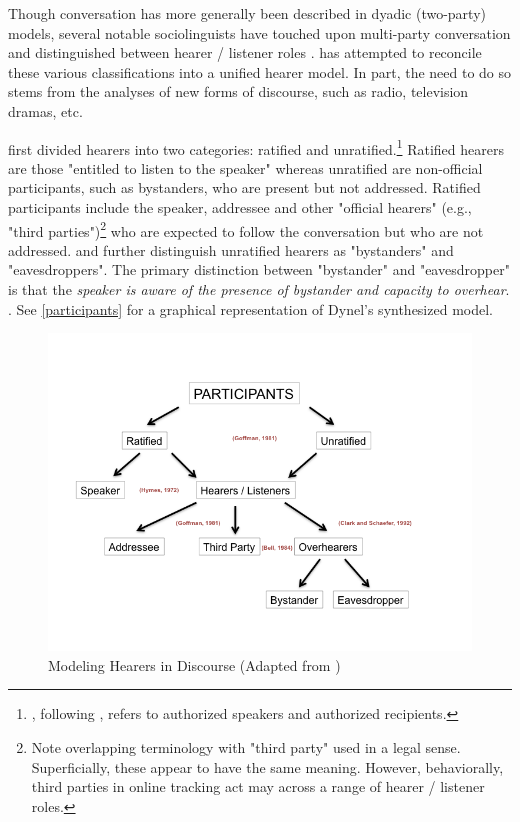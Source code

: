 Though conversation has more generally been described in dyadic (two-party) models, several notable sociolinguists have touched upon multi-party conversation and distinguished between hearer / listener roles \citep{Hymes:1974wr, Goffman:1981tm, Bell:1984tx, Levinson:1988wt, Clark:1982tg, Schober:1989wn, Clark:1987wh, Clark:1992ty, Clark:1996tm}. \citet{Dynel:2010th} has attempted to reconcile these various classifications into a unified hearer model. In part, the need to do so stems from the analyses of new forms of discourse, such as radio, television dramas, etc. 

\cite{Goffman:1981tm} first divided hearers into two categories: ratified and unratified.\footnote{\cite{Levinson:1983ww}, following \cite{SantaCruzlectures:1971te}, refers to authorized speakers and authorized recipients.} Ratified hearers are those "entitled to listen to the speaker" whereas unratified are non-official participants, such as bystanders, who are present but not addressed. Ratified participants include the speaker, addressee and other "official hearers" (e.g., "third parties")\footnote{Note overlapping terminology with "third party" used in a legal sense. Superficially, these appear to have the same meaning. However, behaviorally, third parties in online tracking act may across a range of hearer / listener roles.} who are expected to follow the conversation but who are not addressed. \cite{Bell:1984tx} and \cite{Clark:1992ty} further distinguish unratified hearers as "bystanders" and "eavesdroppers". The primary distinction between "bystander" and "eavesdropper" is that the \textit{speaker is aware of the presence of bystander and capacity to overhear}. \citep{Dynel:2010th, Clark:1992ty}. See \autoref{participants} for a graphical representation of Dynel's \citeyearpar{Dynel:2011fd} synthesized model.

\begin{figure}
\centerline{
\includegraphics[scale=.75]{chapter7.tex/participants}
}
\caption{Modeling Hearers in Discourse (Adapted from  \citealp{Dynel:2010th})}
\label{participants}
\end{figure}

